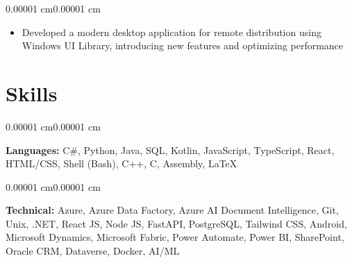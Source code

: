 \documentclass[10pt, letterpaper]{article}
\newenvironment{highlights}{
    \begin{itemize}[
        topsep=0.05 cm,
        parsep=0.05 cm,
        partopsep=0pt,
        itemsep=0pt,
        leftmargin=10pt
    ]
}{
    \end{itemize}
}
\newenvironment{onecolentry}{
    \begin{adjustwidth}{0.00001 cm}{0.00001 cm}
}{
    \end{adjustwidth}
}
\begin{document}
        \vspace{0.05 cm}
        \begin{onecolentry}
            \begin{highlights}
                \item Developed a modern desktop application for remote distribution using Windows UI Library, introducing new features and optimizing performance
            \end{highlights}
        \end{onecolentry}


    \section{Skills}

        \begin{onecolentry}
            \textbf{Languages:} C\#, Python, Java, SQL, Kotlin, JavaScript, TypeScript, React, HTML/CSS, Shell (Bash), C++, C, Assembly, LaTeX
        \end{onecolentry}

        \vspace{0.1 cm}

        \begin{onecolentry}
            \textbf{Technical:} Azure, Azure Data Factory, Azure AI Document Intelligence, Git, Unix, .NET, React JS, Node JS, FastAPI, PostgreSQL, Tailwind CSS, Android, Microsoft Dynamics, Microsoft Fabric, Power Automate, Power BI, SharePoint, Oracle CRM, Dataverse, Docker, AI/ML
        \end{onecolentry}
\end{document}

